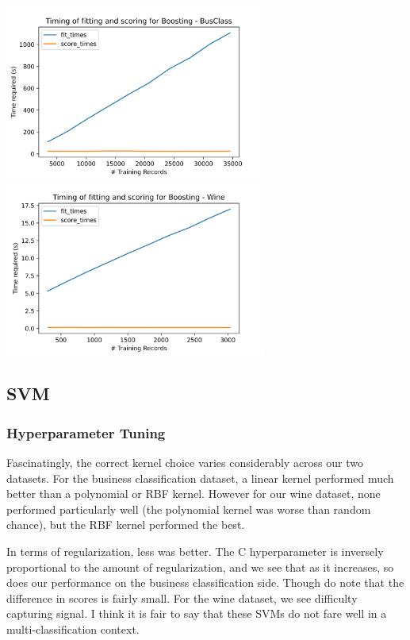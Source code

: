 \documentclass[
	letterpaper, %
]{jdf}
\begin{document}
\includegraphics[width=3.4in]{Figures/BusClass-0920/GBM/time_curve.png}
\includegraphics[width=3.4in]{Figures/Wine-0921/GBM/time_curve.png}


\subsection{SVM}

\subsubsection{Hyperparameter Tuning}

Fascinatingly, the correct kernel choice varies considerably across our two datasets. For the business classification dataset, a linear kernel performed much better than a polynomial or RBF kernel. However for our wine dataset, none performed particularly well (the polynomial kernel was worse than random chance), but the RBF kernel performed the best.

In terms of regularization, less was better. The C hyperparameter is inversely proportional to the amount of regularization, and we see that as it increases, so does our performance on the business classification side. Though do note that the difference in scores is fairly small. For the wine dataset, we see difficulty capturing signal. I think it is fair to say that these SVMs do not fare well in a multi-classification context.
\end{document}
